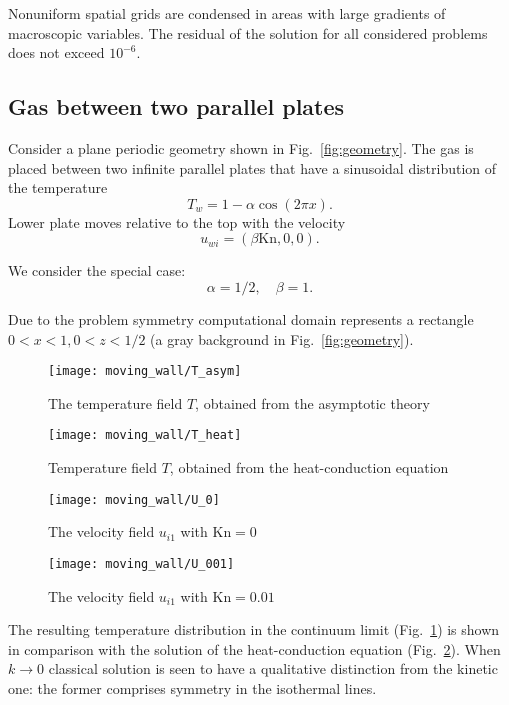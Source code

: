 \documentclass[english,a4paper,10pt]{article}
\newcommand{\Kn}{\mathrm{Kn}}
\begin{document}
Nonuniform spatial grids are condensed in areas with large gradients of macroscopic variables.
The residual of the solution for all considered problems does not exceed \(10^{-6}\).

\subsection{Gas between two parallel plates}

Consider a plane periodic geometry shown in Fig.~\ref{fig:geometry}.
The gas is placed between two infinite parallel plates
that have a sinusoidal distribution of the temperature
\begin{equation}
	T_w = 1-\alpha\cos(2\pi x).
\end{equation}
Lower plate moves relative to the top with the velocity
\begin{equation}
	u_{wi} = (\beta\Kn,0,0).
\end{equation}

We consider the special case:
\[ \alpha=1/2, \quad \beta = 1. \]

Due to the problem symmetry computational domain represents a rectangle \(0<x<1, 0<z<1/2\)
(a gray background in Fig.~\ref{fig:geometry}).

\begin{figure}[ht]
	\centering
	\texttt{[image: moving\_wall/T\_asym]}
	\caption{The temperature field \(T\), obtained from the asymptotic theory}
	\label{fig:moving:T_asym}
\end{figure}

\begin{figure}[ht]
	\centering
	\texttt{[image: moving\_wall/T\_heat]}
	\caption{Temperature field \(T\), obtained from the heat-conduction equation}
	\label{fig:moving:T_heat}
\end{figure}

\begin{figure}[ht]
	\centering
	\texttt{[image: moving\_wall/U\_0]}
	\caption{The velocity field \(u_{i1}\) with \(\Kn = 0\)}\label{fig:moving:fluid}
\end{figure}

\begin{figure}[ht]
	\centering
	\texttt{[image: moving\_wall/U\_001]}
	\caption{The velocity field \(u_{i1}\) with \(\Kn=0.01\)}\label{fig:moving:kn001}
\end{figure}

The resulting temperature distribution in the continuum limit (Fig.~\ref{fig:moving:T_asym}) is shown
in comparison with the solution of the heat-conduction equation (Fig.~\ref{fig:moving:T_heat}).
When \(k\to0\) classical solution is seen to have a qualitative distinction from the kinetic one: 
the former comprises symmetry in the isothermal lines.
\end{document}
